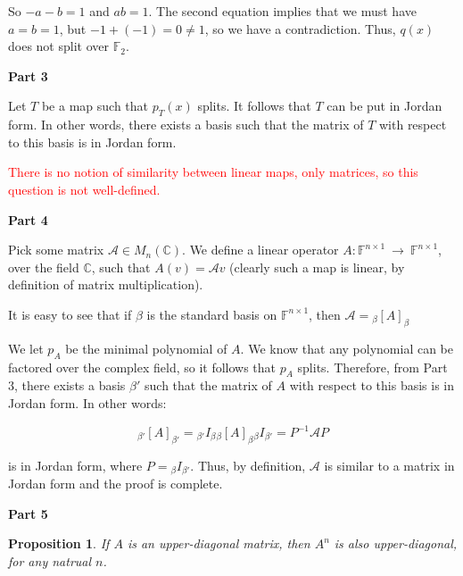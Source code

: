 \documentclass[10pt, oneside]{article}
\newtheorem{prop}{Proposition}
\begin{document}
    So $-a - b = 1$ and $ab = 1$. The second equation implies that we must have $a = b = 1$, but $-1 + (-1) = 0 \neq 1$, so we have a contradiction.
    Thus, $q(x)$ does not split over $\mathbb{F}_2$.
    \newline

    \textbf{Part 3}
    \newline

    Let $T$ be a map such that $p_T(x)$ splits. It follows that $T$ can be put in Jordan form. In other words, there exists a basis such that the
    matrix of $T$ with respect to this basis is in Jordan form.
    \newline

    \textcolor{red}{There is no notion of similarity between linear maps, only matrices, so this question is not well-defined.}
    \newline

    \textbf{Part 4}
    \newline

    Pick some matrix $\mathcal{A} \in M_n(\mathbb{C})$. We define a linear operator $A : \mathbb{F}^{n \times 1} \ \rightarrow \ \mathbb{F}^{n \times 1}$, over the field $\mathbb{C}$, such
    that $A(v) = \mathcal{A}v$ (clearly such a map is linear, by definition of matrix multiplication). 
    \newline

    It is easy to see that if $\beta$ is the standard
    basis on $\mathbb{F}^{n \times 1}$, then $\mathcal{A} = {}_{\beta} [A]_{\beta}$
    \newline

    We let $p_A$ be the minimal polynomial of $A$. We know that any polynomial can be factored over the complex field, so it follows that $p_A$ splits. Therefore, from
    Part 3, there exists a basis $\beta'$ such that the matrix of $A$ with respect to this basis is in Jordan form. In other words:

    $${}_{\beta'} [A]_{\beta'} = {}_{\beta'} I_{\beta} {}_{\beta} [A]_{\beta} {}_{\beta} I_{\beta'} = P^{-1} \mathcal{A} P$$

    is in Jordan form, where $P = {}_{\beta} I_{\beta'}$. Thus, by definition, $\mathcal{A}$ is similar to a matrix in Jordan form and the proof is complete.
    \newline

    \textbf{Part 5}

    \begin{prop}
      If $A$ is an upper-diagonal matrix, then $A^n$ is also upper-diagonal, for any natrual $n$.
    \end{prop}
\end{document}
